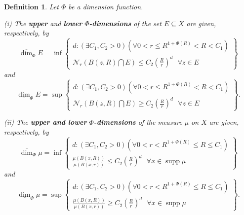 \documentclass{amsart}
\theoremstyle{plain}
\newtheorem{definition}{Definition}
\numberwithin{equation}{section}
\DeclareMathOperator{\supp}{supp}
\newcommand{\odim}{\overline{\dim}}
\newcommand{\udim}{\underline{\dim}}
\begin{document}
\begin{definition}
Let $\Phi$ be a dimension function.

(i) The \textbf{upper} and \textbf{lower} $\Phi$\textbf{-dimensions} of
the set $E\subseteq X$ are given, respectively, by 
\begin{equation*}
          \odim_{\Phi}E=   \inf \left\{ \begin{array}{c}
              d:(\exists C_{1},C_{2}>0)(\forall 0<r\leq R^{1+\Phi (R)}<R<C_{1})\text{} \\ 
           {\mathcal{N}}_r(B(z,R)\bigcap E)\leq C_{2}\left( \frac{R}{r}\right)^{d}\text{ }\forall z\in E\end{array} \right\}
\end{equation*}
and
\begin{equation*}
   \udim_{\Phi}E=\sup \left\{ \begin{array}{c}
           d:(\exists C_{1},C_{2}>0)(\forall 0<r\leq R^{1+\Phi (R)}<R<C_{1})\text{} \\ 
         {\mathcal{N}}_r(B(z,R)\bigcap E)\geq C_{2}\left( \frac{R}{r}\right)^{d}\text{ }\forall z\in E
       \end{array}
   \right\}.
\end{equation*}

(ii) The \textbf{upper and lower} $\Phi$\textbf{-dimensions} of the measure $\mu$ on $X$ are given, respectively, by
\begin{equation*}
  \odim_{\Phi}\mu =\inf \left\{ \begin{array}{c}
            d:(\exists C_{1},C_{2}>0)(\forall 0<r<R^{1+\Phi (R)}\leq R\leq C_{1}) \\ 
         \frac{\mu (B(x,R))}{\mu (B(x,r))}\leq C_{2}\left( \frac{R}{r}\right)^{d}\text{ }\forall x\in \supp\mu
      \end{array}
   \right\}
\end{equation*}
and 
\begin{equation*}
   \udim_{\Phi}\mu =\sup \left\{ \begin{array}{c}
     d:(\exists C_{1},C_{2}>0)(\forall 0<r<R^{1+\Phi (R)}\leq R\leq C_{1}) \\ 
    \frac{\mu (B(x,R))}{\mu (B(x,r))}\geq C_{2}\left( \frac{R}{r}\right)^{d}\text{ }\forall x\in \supp\mu
   \end{array}
\right\}.
\end{equation*}
\end{definition}
\end{document}
